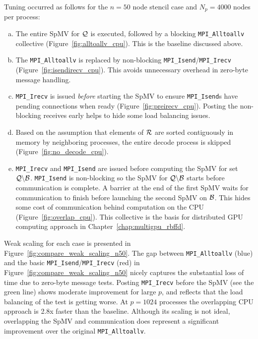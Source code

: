 \documentclass{report}
\begin{document}
Tuning occurred as follows for the $n=50$ node stencil case and $N_p=4000$ nodes per process:  
\begin{enumerate}[(a)]
\item The entire SpMV for $\mathcal{Q}$ is executed, followed by a blocking \texttt{MPI\_Alltoallv} collective (Figure~\ref{fig:alltoallv_cpu}). This is the baseline discussed above.
\item The \texttt{MPI\_Alltoallv} is replaced by non-blocking \texttt{MPI\_Isend}/\texttt{MPI\_Irecv} (Figure~\ref{fig:isendirecv_cpu}). This avoids unnecessary overhead in zero-byte message handling. 
\item \texttt{MPI\_Irecv} is issued \emph{before} starting the SpMV to ensure \texttt{MPI\_Isend}s have pending connections when ready (Figure~\ref{fig:preirecv_cpu}). Posting the non-blocking receives early helps to hide some load balancing issues. 
\item Based on the assumption that elements of $\mathcal{R}$ are sorted contiguously in memory by neighboring processes, the entire decode process is skipped (Figure~\ref{fig:no_decode_cpu}). 
\item \texttt{MPI\_Irecv} and \texttt{MPI\_Isend} are issued before computing the SpMV for set $\mathcal{Q} \backslash \mathcal{B}$. \texttt{MPI\_Isend} is non-blocking so the SpMV for $\mathcal{Q} \backslash \mathcal{B}$ starts before communication is complete. A barrier at the end of the first SpMV waits for communication to finish before launching the second SpMV on $\mathcal{B}$. This hides some cost of communication behind computation on the CPU (Figure~\ref{fig:overlap_cpu}). This collective is the basis for distributed GPU computing approach in Chapter~\ref{chap:multigpu_rbffd}.
\end{enumerate}
\noindent Weak scaling for each case is presented in Figure~\ref{fig:compare_weak_scaling_n50}. The gap between \texttt{MPI\_Alltoallv} (blue) and the basic \texttt{MPI\_Isend}/\texttt{MPI\_Irecv} (red) in Figure~\ref{fig:compare_weak_scaling_n50} nicely captures the substantial loss of time due to zero-byte message tests. Posting \texttt{MPI\_Irecv} before the SpMV (see the green line) shows moderate improvement for large $p$, and reflects that the load balancing of the test is getting worse. At $p=1024$ processes the overlapping CPU approach is 2.8x faster than the baseline. Although its scaling is not ideal, overlapping the SpMV and communication does represent a significant improvement over the original \texttt{MPI\_Alltoallv}. %
\end{document}
